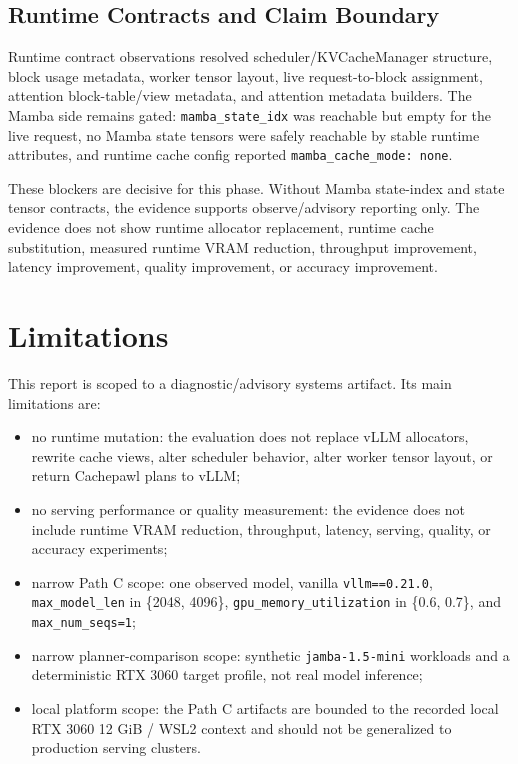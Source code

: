\documentclass[11pt]{article}
\begin{document}
\subsection{Runtime Contracts and Claim Boundary}

Runtime contract observations resolved scheduler/KVCacheManager structure,
block usage metadata, worker tensor layout, live request-to-block assignment,
attention block-table/view metadata, and attention metadata builders. The Mamba
side remains gated: \texttt{mamba\_state\_idx} was reachable but empty for the
live request, no Mamba state tensors were safely reachable by stable runtime
attributes, and runtime cache config reported \texttt{mamba\_cache\_mode: none}.

These blockers are decisive for this phase. Without Mamba state-index and state
tensor contracts, the evidence supports observe/advisory reporting only. The
evidence does not show runtime allocator replacement, runtime cache
substitution, measured runtime VRAM reduction, throughput improvement, latency
improvement, quality improvement, or accuracy improvement.

\section{Limitations}

This report is scoped to a diagnostic/advisory systems artifact. Its main
limitations are:

\begin{itemize}
\item no runtime mutation: the evaluation does not replace vLLM allocators,
rewrite cache views, alter scheduler behavior, alter worker tensor layout, or
return Cachepawl plans to vLLM;
\item no serving performance or quality measurement: the evidence does not
include runtime VRAM reduction, throughput, latency, serving, quality, or
accuracy experiments;
\item narrow Path C scope: one observed model, vanilla \texttt{vllm==0.21.0},
\texttt{max\_model\_len} in \{2048, 4096\},
\texttt{gpu\_memory\_utilization} in \{0.6, 0.7\}, and
\texttt{max\_num\_seqs=1};
\item narrow planner-comparison scope: synthetic \texttt{jamba-1.5-mini}
workloads and a deterministic RTX 3060 target profile, not real model
inference;
\item local platform scope: the Path C artifacts are bounded to the recorded
local RTX 3060 12 GiB / WSL2 context and should not be generalized to
production serving clusters.
\end{itemize}
\end{document}
